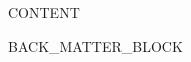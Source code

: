 \documentclass[11pt,openany]{book}
\begin{document}

{{CONTENT}}


\backmatter
{{BACK_MATTER_BLOCK}}



\clearpage
\thispagestyle{empty}\null\clearpage
\ifodd\value{page}\else\thispagestyle{empty}\null\clearpage\fi
\end{document}
